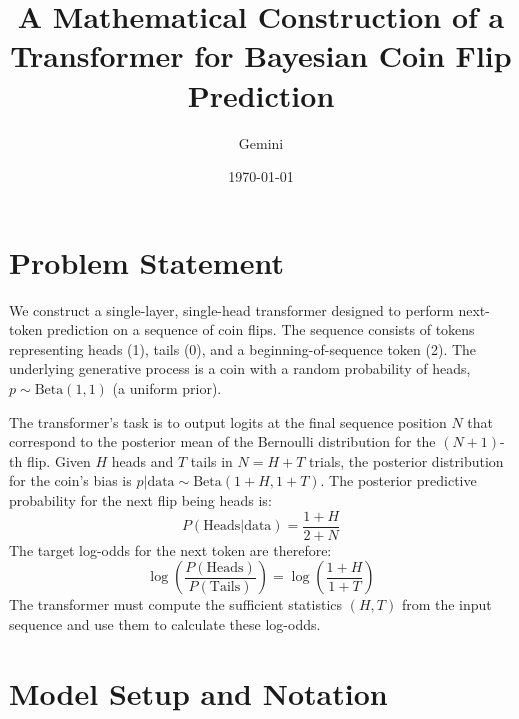 \documentclass{article}
\title{A Mathematical Construction of a Transformer for Bayesian Coin Flip Prediction}
\author{Gemini}
\date{\today}
\begin{document}
\maketitle

\section{Problem Statement}

We construct a single-layer, single-head transformer designed to perform next-token prediction on a sequence of coin flips. The sequence consists of tokens representing heads (1), tails (0), and a beginning-of-sequence token (2). The underlying generative process is a coin with a random probability of heads, $p \sim \text{Beta}(1,1)$ (a uniform prior).

The transformer's task is to output logits at the final sequence position $N$ that correspond to the posterior mean of the Bernoulli distribution for the $(N+1)$-th flip. Given $H$ heads and $T$ tails in $N=H+T$ trials, the posterior distribution for the coin's bias is $p | \text{data} \sim \text{Beta}(1+H, 1+T)$. The posterior predictive probability for the next flip being heads is:
\begin{equation}
    P(\text{Heads} | \text{data}) = \frac{1+H}{2+N}
\end{equation}
The target log-odds for the next token are therefore:
\begin{equation}
    \log\left(\frac{P(\text{Heads})}{P(\text{Tails})}\right) = \log\left(\frac{1+H}{1+T}\right)
\end{equation}
The transformer must compute the sufficient statistics $(H, T)$ from the input sequence and use them to calculate these log-odds.

\section{Model Setup and Notation}
\end{document}
